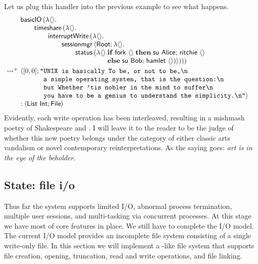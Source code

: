 \documentclass[12pt,phd,lfcs,twoside,openright,logo,leftchapter,normalheadings]{infthesis}
\theoremstyle{plain}
\theoremstyle{definition}
\begin{document}
Let us plug this handler into the previous example to see what
happens.
%
\[
  \ba{@{~}l@{~}l}
    &\bl
    \basicIO\,(\lambda\Unit.\\
         \qquad\timeshare\,(\lambda\Unit.\\
         \qquad\qquad\dec{interruptWrite}\,(\lambda\Unit.\\
         \qquad\qquad\qquad\sessionmgr\,\Record{\Root;\lambda\Unit.\\
         \qquad\qquad\qquad\qquad\status\,(\lambda\Unit.
                 \ba[t]{@{}l}
                   \If\;\fork~\Unit\;\Then\;
                       \su~\Alice;\,
                       \quoteRitchie~\Unit\\
                   \Else\;
                       \su~\Bob;\,
                       \quoteHamlet~\Unit)})))
                 \ea
     \el \smallskip\\
     \reducesto^+&
     \bl
      \Record{
       \ba[t]{@{}l}
         [0, 0];
         \texttt{"}\ba[t]{@{}l}
         \texttt{UNIX is basically To be, or not to be,\nl{}}\\
         \texttt{a simple operating system, that is the question:\nl{}}\\
         \texttt{but Whether 'tis nobler in the mind to suffer\nl{}}\\
         \texttt{you have to be a genius to understand the simplicity.\nl{}"}}
         \ea
       \ea\\
       : \Record{\List~\Int; \UFile}
     \el
  \ea
\]
%
Evidently, each write operation has been interleaved, resulting in a
mishmash poetry of Shakespeare and \UNIX{}.
%
I will leave it to the reader to be the judge of whether this new
poetry belongs under the category of either classic arts vandalism or
novel contemporary reinterpretations.  As the saying goes: \emph{art
  is in the eye of the beholder}.

\subsection{State: file i/o}
\label{sec:tiny-unix-io}

Thus far the system supports limited I/O, abnormal process
termination, multiple user sessions, and multi-tasking via concurrent
processes. At this stage we have most of core features in place. We
still have to complete the I/O model. The current I/O model provides
an incomplete file system consisting of a single write-only file.
%
In this section we will implement a \UNIX{}-like file system that
supports file creation, opening, truncation, read and write
operations, and file linking.
%
\end{document}
